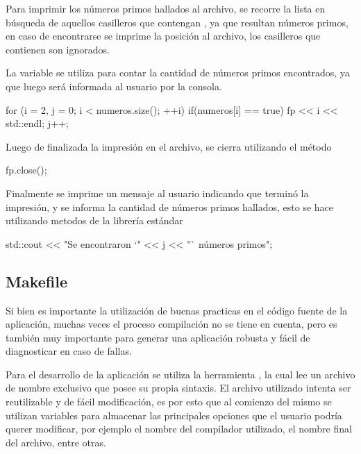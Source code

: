\documentclass[12pt]{article}
\newenvironment{fullgrayverb}
{\verbbox}
{\endverbbox\par\colorbox{gray!25}{\parbox{\textwidth}{\theverbbox}}\par}
\begin{document}
Para imprimir los números primos hallados al archivo, se recorre la lista en
búsqueda de aquellos casilleros que contengan , ya que resultan
números primos, en caso de encontrarse se imprime la posición al archivo, los 
casilleros que contienen  son ignorados. 

La variable  se utiliza para contar la cantidad de números primos
encontrados, ya que luego será informada al usuario por la consola.

\begin{fullgrayverb}[\mbox{}]
for (i = 2, j = 0; i < numeros.size(); ++i) {
    if(numeros[i] == true) {
        fp << i << std::endl;
        j++;
    }
}
\end{fullgrayverb}

Luego de finalizada la impresión en el archivo, se cierra utilizando el método

\begin{fullgrayverb}[\mbox{}]
fp.close();
\end{fullgrayverb}

Finalmente se imprime un mensaje al usuario indicando que terminó la impresión,
y se informa la cantidad de números primos hallados, esto se hace utilizando
metodos de la librería estándar  

\begin{fullgrayverb}[\mbox{}]
std::cout << "Se encontraron `" << j << "` números primos\n";
\end{fullgrayverb}

\pagebreak
\subsection{Makefile}

Si bien es importante la utilización de buenas practicas en el código fuente de
la aplicación, muchas veces el proceso compilación no se tiene en cuenta,
pero es también muy importante para generar una aplicación robusta y fácil de
diagnosticar en caso de fallas.

Para el desarrollo de la aplicación se utiliza la herramienta ,
la cual lee un archivo de nombre exclusivo  que posee su propia
sintaxis. El archivo  utilizado intenta ser reutilizable y de
fácil modificación, es por esto que al comienzo del mismo se utilizan variables
para almacenar las principales opciones que el usuario podría querer modificar,
por ejemplo el nombre del compilador utilizado, el nombre final del archivo,
entre otras.
\end{document}
